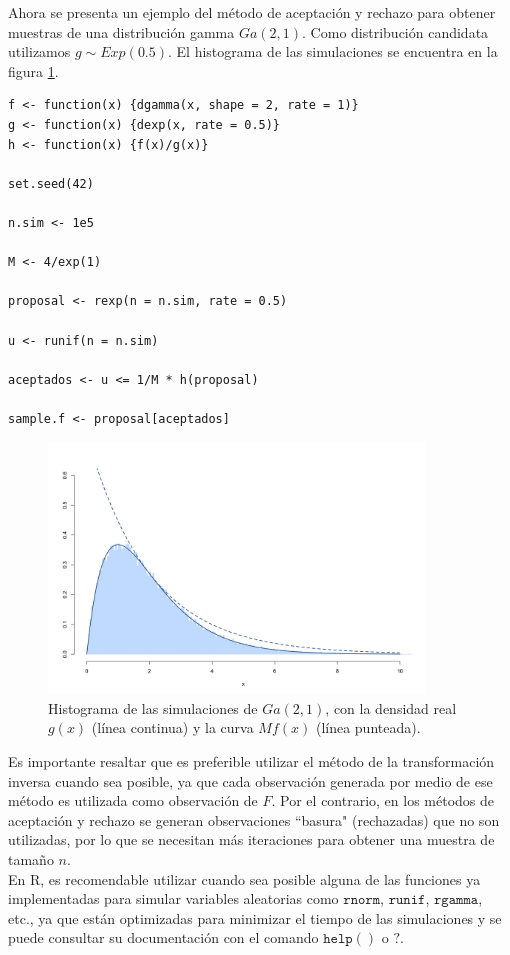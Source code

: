 \documentclass[11pt,a4paper]{article}
\begin{document}
Ahora se presenta un ejemplo del método de aceptación y rechazo para obtener muestras de una distribución gamma $Ga(2, 1).$ Como distribución candidata utilizamos $g \sim Exp(0.5).$ El histograma de las simulaciones se encuentra en la figura \ref{fig:acep_rech}.\\

\begin{lstlisting}
f <- function(x) {dgamma(x, shape = 2, rate = 1)}
g <- function(x) {dexp(x, rate = 0.5)}
h <- function(x) {f(x)/g(x)}

set.seed(42)

n.sim <- 1e5

M <- 4/exp(1)

proposal <- rexp(n = n.sim, rate = 0.5)

u <- runif(n = n.sim)

aceptados <- u <= 1/M * h(proposal)

sample.f <- proposal[aceptados]
\end{lstlisting}

\begin{figure}
\centering\includegraphics[width=10cm]{aceptacion_rechazo.png}
\caption{Histograma de las simulaciones de $Ga(2, 1)$, con la densidad real $g(x)$ (línea continua) y la curva $M f(x)$ (línea punteada).}
\label{fig:acep_rech}
\end{figure}

Es importante resaltar que es preferible utilizar el método de la transformación inversa cuando sea posible, ya que cada observación generada por medio de ese método es utilizada como observación de $F$. Por el contrario, en los métodos de aceptación y rechazo se generan observaciones ``basura" (rechazadas) que no son utilizadas, por lo que se necesitan más iteraciones para obtener una muestra de tamaño $n$.\\

En R, es recomendable utilizar cuando sea posible alguna de las funciones ya implementadas para simular variables aleatorias como $\mathtt{rnorm}$, $\mathtt{runif}$, $\mathtt{rgamma}$, etc., ya que están optimizadas para minimizar el tiempo de las simulaciones y se puede consultar su documentación con el comando $\mathtt{help()}$ o $\mathtt{?}$.\\
\end{document}
